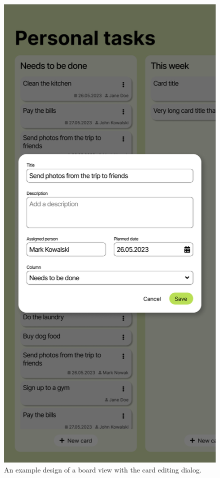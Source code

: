 \begin{figure}
    \centering
    \includegraphics[height=0.4\textheight]{./3-research-methodology/board-view-with-dialog}
    \caption{An example design of a board view with the card editing dialog.}
    \label{fig:3-4-board-view-with-dialog}
\end{figure}

